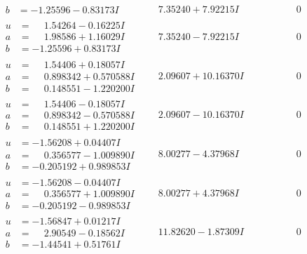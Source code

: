 \documentclass[1p]{elsarticle_modified}
\theoremstyle{definition}
\begin{document}
$$\begin{array}{c|c|c}
\begin{aligned}
b &= -1.25596 - 0.83173 I\end{aligned}
 & \phantom{-}7.35240 + 7.92215 I & \phantom{-0.000000 } 0 \\ \hline\begin{aligned}
u &= \phantom{-}1.54264 - 0.16225 I \\
a &= \phantom{-}1.98586 + 1.16029 I \\
b &= -1.25596 + 0.83173 I\end{aligned}
 & \phantom{-}7.35240 - 7.92215 I & \phantom{-0.000000 } 0 \\ \hline\begin{aligned}
u &= \phantom{-}1.54406 + 0.18057 I \\
a &= \phantom{-}0.898342 + 0.570588 I \\
b &= \phantom{-}0.148551 - 1.220200 I\end{aligned}
 & \phantom{-}2.09607 + 10.16370 I & \phantom{-0.000000 } 0 \\ \hline\begin{aligned}
u &= \phantom{-}1.54406 - 0.18057 I \\
a &= \phantom{-}0.898342 - 0.570588 I \\
b &= \phantom{-}0.148551 + 1.220200 I\end{aligned}
 & \phantom{-}2.09607 - 10.16370 I & \phantom{-0.000000 } 0 \\ \hline\begin{aligned}
u &= -1.56208 + 0.04407 I \\
a &= \phantom{-}0.356577 - 1.009890 I \\
b &= -0.205192 + 0.989853 I\end{aligned}
 & \phantom{-}8.00277 - 4.37968 I & \phantom{-0.000000 } 0 \\ \hline\begin{aligned}
u &= -1.56208 - 0.04407 I \\
a &= \phantom{-}0.356577 + 1.009890 I \\
b &= -0.205192 - 0.989853 I\end{aligned}
 & \phantom{-}8.00277 + 4.37968 I & \phantom{-0.000000 } 0 \\ \hline\begin{aligned}
u &= -1.56847 + 0.01217 I \\
a &= \phantom{-}2.90549 - 0.18562 I \\
b &= -1.44541 + 0.51761 I\end{aligned}
 & \phantom{-}11.82620 - 1.87309 I & \phantom{-0.000000 } 0 \\ \hline\begin{aligned}

\end{aligned}
\end{array}$$
\end{document}
